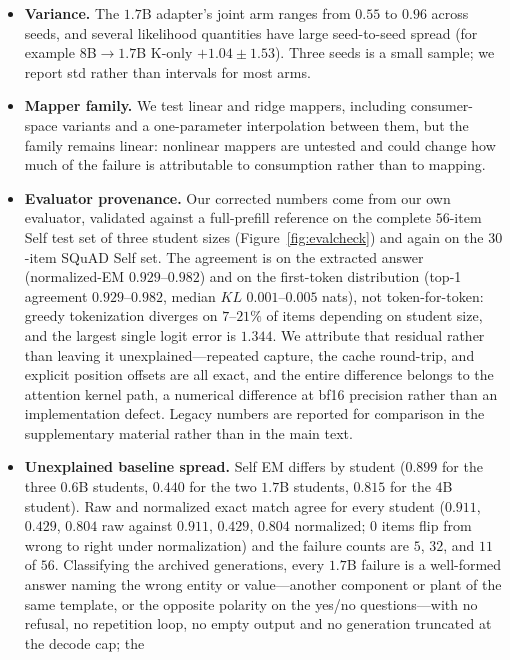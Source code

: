 \documentclass[11pt]{article}
\begin{document}
\begin{itemize}
  on, and the clustered intervals still leave that pair's V-only arm far below
  Self.
\item \textbf{Variance.} The $1.7$B adapter's joint arm ranges from $0.55$ to
  $0.96$ across seeds, and several likelihood quantities have large seed-to-seed
  spread (for example $8$B$\to1.7$B K-only $+1.04 \pm 1.53$). Three seeds is a
  small sample; we report std rather than intervals for most arms.
\item \textbf{Mapper family.} We test linear and ridge mappers, including
  consumer-space variants and a one-parameter interpolation between them, but the
  family remains linear: nonlinear mappers are untested and could change how much
  of the failure is attributable to consumption rather than to mapping.
\item \textbf{Evaluator provenance.} Our corrected numbers come from our own
  evaluator, validated against a full-prefill reference on the complete $56$-item
  Self test set of three student sizes (Figure~\ref{fig:evalcheck}) and again on
  the $30$-item SQuAD Self set. The agreement is on the extracted answer
  (normalized-EM $0.929$--$0.982$) and on the first-token distribution (top-1
  agreement $0.929$--$0.982$, median $KL$ $0.001$--$0.005$ nats), not
  token-for-token: greedy tokenization diverges on $7$--$21\%$ of items depending
  on student size, and the largest single logit error is $1.344$. We attribute
  that residual rather than leaving it unexplained---repeated capture, the cache
  round-trip, and explicit position offsets are all exact, and the entire
  difference belongs to the attention kernel path, a numerical difference at
  bf16 precision rather than an implementation defect. Legacy numbers are
  reported for comparison in the supplementary material rather than in the main
  text.
\item \textbf{Unexplained baseline spread.} Self EM differs by student
  ($0.899$ for the three $0.6$B students, $0.440$ for the two $1.7$B students,
  $0.815$ for the $4$B student). Raw and normalized exact match agree for every
  student ($0.911$, $0.429$, $0.804$ raw against $0.911$, $0.429$, $0.804$
  normalized; $0$ items flip from wrong to right under normalization) and the
  failure counts are $5$, $32$, and $11$ of $56$. Classifying the archived
  generations, every $1.7$B failure is a well-formed answer naming the wrong
  entity or value---another component or plant of the same template, or the
  opposite polarity on the yes/no questions---with no refusal, no repetition
  loop, no empty output and no generation truncated at the decode cap; the

\end{itemize}
\end{document}

